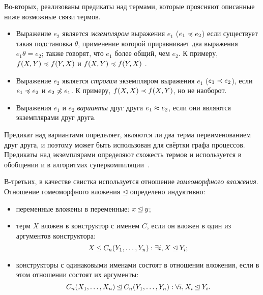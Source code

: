
Во-вторых, реализованы предикаты над термами, которые проясняют описанные ниже возможные связи термов.
\begin{itemize}
\item Выражение $e_2$ является \emph{экземпляром} выражения $e_1$ ($e_1 \preccurlyeq e_2$)
если существует такая подстановка $\theta$, применение которой приравнивает
два выражения $e_1 \theta = e_2$; также говорят, что $e_1$ более общий, чем $e_2$.
К примеру, $f(X, Y) \preccurlyeq f(Y, X)$ и $f(X, Y) \preccurlyeq f(Y, X)$ .
\item Выражение $e_2$ является \emph{строгим} экземпляром выражения $e_1$ ($e_1 \prec e_2$), если
$e_1 \preccurlyeq e_2$ и $e_2 \not\preccurlyeq e_1$. К примеру, $f(X, X) \prec f(X, Y)$, но не наоборот.
\item Выражения $e_1$ и $e_2$ \emph{варианты} друг друга $e_1\approx e_2$, если они являются экземплярами друг друга.
\end{itemize}

Предикат над вариантами определяет, являются ли два терма переименованием друг друга,
и поэтому может быть использован для свёртки графа процессов. Предикаты над экземплярами определяют
схожесть термов и используется в обобщении и в алгоритмах суперкомпиляции~\cite{scPos}.


В-третьих, в качестве свистка используется отношение \emph{гомеоморфного вложения}\cite{scGen}.
Отношение гомеоморфного вложения $\unlhd$ определено индуктивно:
\begin{itemize}
\item переменные вложены в переменные: $x \unlhd y$;
\item терм $X$ вложен в конструктор с именем $C$, если он вложен в один из аргументов конструктора:
      $$X \unlhd C_n(Y_1, \dots, Y_n): \exists i, X \unlhd Y_i;$$
\item конструкторы с одинаковыми именами состоят в отношении вложения, если в этом отношении
      состоят их аргументы:
      $$C_n(X_1, \dots, X_n) \unlhd C_n(Y_1, \dots, Y_n): \forall i, X_i \unlhd Y_i.$$
\end{itemize}

